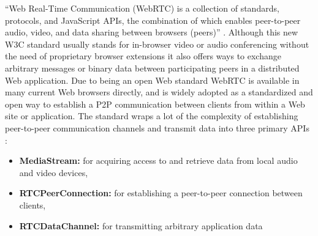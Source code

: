 ``Web Real-Time Communication (\gls{WebRTC}) is a collection of standards, protocols, and JavaScript \gls{API}s, the combination of which enables peer-to-peer audio, video, and data sharing between browsers (peers)'' \citep[pg. 307]{grigorik2013high}. Although this new \gls{W3C} standard usually stands for in-browser video or audio conferencing without the need of proprietary browser extensions it also offers ways to exchange arbitrary messages or binary data between participating peers in a distributed Web application. Due to being an open Web standard \gls{WebRTC} is available in many current Web browsers directly, and is widely adopted as a standardized and open way to establish a \gls{P2P} communication between clients from within a Web site or application. The standard wraps a lot of the complexity of establishing peer-to-peer communication channels and transmit data into three primary \gls{API}s \citep[pg. 307-308]{grigorik2013high}: \@

\begin{itemize}
	\item \textbf{MediaStream:} for acquiring access to and retrieve data from local audio and video devices,
	\item \textbf{RTCPeerConnection:} for establishing a peer-to-peer connection between clients,
	\item \textbf{RTCDataChannel:} for transmitting arbitrary application data
\end{itemize}


